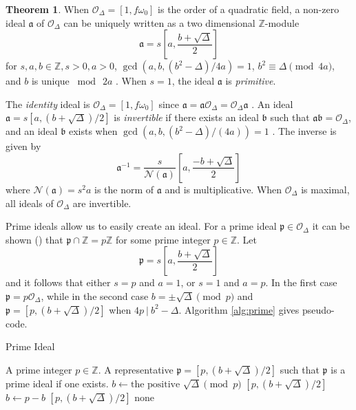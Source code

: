 \documentclass{ucalgthes1}
\theoremstyle{definition}
\newtheorem{thm}{Theorem}[section]
\newcommand{\OO}{\mathcal{O}}
\newcommand{\ZZ}{\mathbb{Z}}
\begin{document}
\begin{thm}
\label{thm:idealZModule}
When $\OO_\Delta = [1, f\omega_0]$ is the order of a quadratic field, a non-zero ideal $\mathfrak a$ of $\OO_\Delta$ can be uniquely written as a two dimensional $\ZZ$-module 
\[
	\mathfrak a = s\left[a, \frac{b+\sqrt{\Delta}}{2} \right]
\]
for $s, a, b \in \ZZ, s > 0, a > 0$, $\gcd(a, b, (b^2-\Delta)/4a)=1$, $b^2 \equiv \Delta \pmod{4a}$, and $b$ is unique $\bmod ~2a$ \cite[p.13]{Jacobson1999}. When $s = 1$, the ideal $\mathfrak a$ is \emph{primitive}.
\end{thm}

The \emph{identity} ideal is $\OO_\Delta = [1, f\omega_0]$ since $\mathfrak a = \mathfrak a \OO_\Delta = \OO_\Delta \mathfrak a$ \cite{Cohn1980}. An ideal $\mathfrak a = s[a, (b+\sqrt{\Delta})/2]$ is \emph{invertible} if there exists an ideal $\mathfrak b$ such that $\mathfrak a \mathfrak b = \OO_\Delta$, and an ideal $\mathfrak b$ exists when $\gcd(a, b, (b^2-\Delta)/(4a)) = 1$ \cite[p.14]{Jacobson1999}. The inverse is given by \cite[pp.14,15]{Jacobson1999}
\[
	{\mathfrak a}^{-1} = \frac{s}{\mathcal N(\mathfrak a)} \left[a, \frac{-b+\sqrt{\Delta}}{2} \right]
\]
where $\mathcal N(\mathfrak a) = s^2a$ is the norm of $\mathfrak a$ and is multiplicative. When $\OO_\Delta$ is maximal, all ideals of $\OO_\Delta$ are invertible. 

Prime ideals allow us to easily create an ideal.  For a prime ideal $\mathfrak p \in \OO_\Delta$ it can be shown (\cite[p.19]{Jacobson1999}) that $\mathfrak p \cap \ZZ = p\ZZ$ for some prime integer $p \in \ZZ$. Let
\[
	\mathfrak p = s\left[a, \frac{b + \sqrt{\Delta}}{2}\right]
\]
and it follows that either $s=p$ and $a=1$, or $s=1$ and $a=p$.  In the first case $\mathfrak p = p\OO_\Delta$, while in the second case $b = \pm \sqrt{\Delta} \pmod p$ and $\mathfrak p = [p, (b + \sqrt{\Delta})/2]$ when $4p ~|~ b^2 - \Delta$.  Algorithm \ref{alg:prime} gives pseudo-code.

\bigbreak
\begin{algorithm}[h]
\caption{Prime Ideal}
\label{alg:prime}
\begin{algorithmic}[1]
\REQUIRE A prime integer $p \in \ZZ$.
\ENSURE A representative $\mathfrak p = [p, (b+\sqrt\Delta)/2]$ such that $\mathfrak p$ is a prime ideal if one exists.
\STATE $b \gets \textrm{the positive } \sqrt\Delta \pmod p$
	\RETURN $[p, (b+\sqrt\Delta)/2]$
\ENDIF
\STATE $b \gets p-b$
	\RETURN $[p, (b+\sqrt\Delta)/2]$
\ENDIF
\RETURN none
\end{algorithmic}
\end{algorithm}
\end{document}
